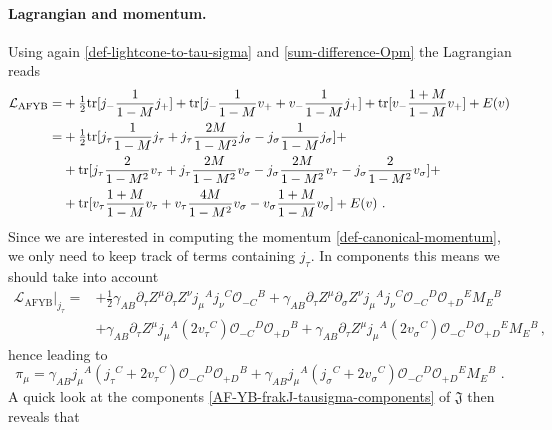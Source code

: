 \documentclass[12pt]{article}
\numberwithin{equation}{section}
\begin{document}
\paragraph{Lagrangian and momentum.} Using again \eqref{def-lightcone-to-tau-sigma} and \eqref{sum-difference-Opm} the Lagrangian reads
\begin{align}\label{AF-YB-Lagrangian}
\mathcal{L}_{\mathrm{AFYB}}=&+\tfrac{1}{2}\mathrm{tr}[j_{-}\frac{1}{1-M} j_{+}]+\mathrm{tr}[j_{-}\frac{1}{1-M} v_{+}+v_{-}\frac{1}{1-M} j_{+}]+\mathrm{tr}[v_{-}\frac{1+M}{1-M} v_{+}]+E(v)
\notag \\
=&+\tfrac{1}{2}\mathrm{tr}[j_{\tau}\frac{1}{1-M} j_{\tau}+j_{\tau}\frac{2M}{1-M^2} j_{\sigma}-j_{\sigma}\frac{1}{1-M} j_{\sigma}]+
\notag \\
&+\mathrm{tr}[j_{\tau}\frac{2}{1-M^2} v_{\tau}+j_{\tau}\frac{2M}{1-M^2} v_{\sigma}-j_{\sigma}\frac{2M}{1-M^2} v_{\tau}-j_{\sigma}\frac{2}{1-M^2} v_{\sigma}]+
\notag \\
&+\mathrm{tr}[v_{\tau}\frac{1+M}{1-M} v_{\tau}+v_{\tau}\frac{4M}{1-M^2} v_{\sigma}-v_{\sigma}\frac{1+M}{1-M} v_{\sigma}]+ E(v) \,\, .
\end{align} 
Since we are interested in computing the momentum \eqref{def-canonical-momentum}, we only need to keep track of terms containing $j_{\tau}$. In components this means we should take into account
\begin{equation}
\begin{aligned}
\!\!\!\!\mathcal{L}_{\mathrm{\!AFYB}}\!|_{j_{\tau}}\!\!\!=\!&+\!\tfrac{1}{2}\gamma_{AB}\partial_{\tau}Z^{\mu}\partial_{\tau}Z^{\nu}j_{\mu}{}^{A}j_{\nu}{}^{C}\mathcal{O}_{-C}{}^{B} \!\!+\!\gamma_{AB}\partial_{\tau}Z^{\mu}\partial_{\sigma}Z^{\nu}j_{\mu}{}^{A}j_{\nu}{}^{C}\mathcal{O}_{-C}{}^{D}\mathcal{O}_{+D}{}^{E}M_{E}{}^{B}
\\
&+\!\gamma_{AB}\partial_{\tau}Z^{\mu}j_{\mu}{}^{A}(2v_{\tau}{}^{C})\mathcal{O}_{-C}{}^{D}\mathcal{O}_{+D}{}^{B}\!\!+\!\gamma_{AB}\partial_{\tau}Z^{\mu}j_{\mu}{}^{A}(2v_{\sigma}{}^{C})\mathcal{O}_{-C}{}^{D}\mathcal{O}_{+D}{}^{E}M_{E}{}^{B} \, ,
\end{aligned}
\end{equation}
hence leading to
\begin{equation}
\pi_{\mu}=\gamma_{AB}j_{\mu}{}^{A}(j_{\tau}{}^{C}+2v_{\tau}{}^{C})\mathcal{O}_{-C}{}^{D}\mathcal{O}_{+D}{}^{B}+\gamma_{AB}j_{\mu}{}^{A}(j_{\sigma}{}^{C}+2v_{\sigma}{}^{C})\mathcal{O}_{-C}{}^{D}\mathcal{O}_{+D}{}^{E}M_{E}{}^{B} \,\, .
\end{equation}
A quick look at the components \eqref{AF-YB-frakJ-tausigma-components} of $\mathfrak{J}$ then reveals that
\end{document}
